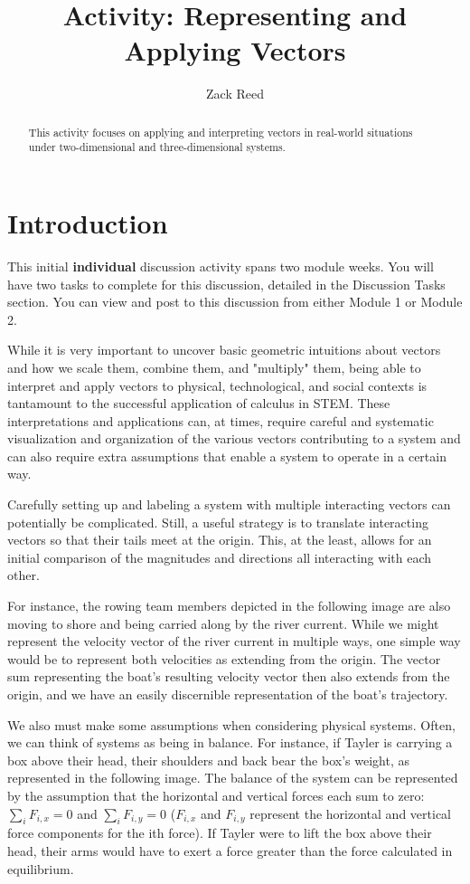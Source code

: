 \documentclass{ximera}
\title{Activity: Representing and Applying Vectors}
\author{Zack Reed}
\begin{document}
\begin{abstract}
This  activity focuses on applying and interpreting vectors in real-world situations under two-dimensional and three-dimensional systems.
\end{abstract}
\maketitle


\section{Introduction}

This initial \textbf{individual} discussion activity spans two module weeks. You will have two tasks to complete for this discussion, detailed in the Discussion Tasks section. You can view and post to this discussion from either Module 1 or Module 2.

While it is very important to uncover basic geometric intuitions about vectors and how we scale them, combine them, and "multiply" them, being able to interpret and apply vectors to physical, technological, and social contexts is tantamount to the successful application of calculus in STEM. These interpretations and applications can, at times, require careful and systematic visualization and organization of the various vectors contributing to a system and can also require extra assumptions that enable a system to operate in a certain way.

Carefully setting up and labeling a system with multiple interacting vectors can potentially be complicated. Still, a useful strategy is to translate interacting vectors so that their tails meet at the origin. This, at the least, allows for an initial comparison of the magnitudes and directions all interacting with each other.

For instance, the rowing team members depicted in the following image are also moving to shore and being carried along by the river current. While we might represent the velocity vector of the river current in multiple ways, one simple way would be to represent both velocities as extending from the origin. The vector sum representing the boat's resulting velocity vector then also extends from the origin, and we have an easily discernible representation of the boat's trajectory.


We also must make some assumptions when considering physical systems. Often, we can think of systems as being in balance. For instance, if Tayler is carrying a box above their head, their shoulders and back bear the box's weight, as represented in the following image. The balance of the system can be represented by the assumption that the horizontal and vertical forces each sum to zero: $\sum_iF_{i,x}=0$ and $\sum_iF_{i,y}=0$ ($F_{i,x}$ and $F_{i,y}$ represent the horizontal and vertical force components for the ith force). If Tayler were to lift the box above their head, their arms would have to exert a force greater than the force calculated in equilibrium.
\end{document}
